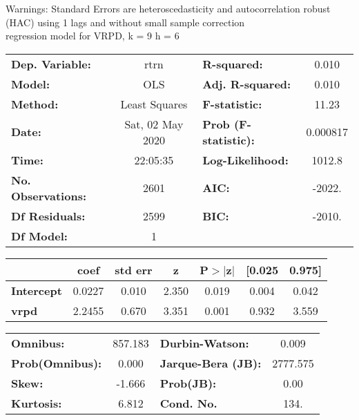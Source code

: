 Warnings: \newline
 [1] Standard Errors are heteroscedasticity and autocorrelation robust (HAC) using 1 lags and without small sample correction\\ 

regression model for VRPD, k = 9 h = 6\begin{center}
\begin{tabular}{lclc}
\toprule
\textbf{Dep. Variable:}    &       rtrn       & \textbf{  R-squared:         } &     0.010   \\
\textbf{Model:}            &       OLS        & \textbf{  Adj. R-squared:    } &     0.010   \\
\textbf{Method:}           &  Least Squares   & \textbf{  F-statistic:       } &     11.23   \\
\textbf{Date:}             & Sat, 02 May 2020 & \textbf{  Prob (F-statistic):} &  0.000817   \\
\textbf{Time:}             &     22:05:35     & \textbf{  Log-Likelihood:    } &    1012.8   \\
\textbf{No. Observations:} &        2601      & \textbf{  AIC:               } &    -2022.   \\
\textbf{Df Residuals:}     &        2599      & \textbf{  BIC:               } &    -2010.   \\
\textbf{Df Model:}         &           1      & \textbf{                     } &             \\
\bottomrule
\end{tabular}
\begin{tabular}{lcccccc}
                   & \textbf{coef} & \textbf{std err} & \textbf{z} & \textbf{P$> |$z$|$} & \textbf{[0.025} & \textbf{0.975]}  \\
\midrule
\textbf{Intercept} &       0.0227  &        0.010     &     2.350  &         0.019        &        0.004    &        0.042     \\
\textbf{vrpd}      &       2.2455  &        0.670     &     3.351  &         0.001        &        0.932    &        3.559     \\
\bottomrule
\end{tabular}
\begin{tabular}{lclc}
\textbf{Omnibus:}       & 857.183 & \textbf{  Durbin-Watson:     } &    0.009  \\
\textbf{Prob(Omnibus):} &   0.000 & \textbf{  Jarque-Bera (JB):  } & 2777.575  \\
\textbf{Skew:}          &  -1.666 & \textbf{  Prob(JB):          } &     0.00  \\
\textbf{Kurtosis:}      &   6.812 & \textbf{  Cond. No.          } &     134.  \\
\bottomrule
\end{tabular}
\end{center}

